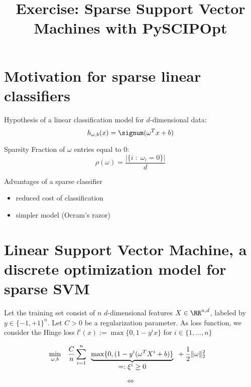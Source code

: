 \documentclass[10pt]{beamer}
\title{Exercise: Sparse Support Vector Machines with PySCIPOpt}
\begin{document}
\section{Motivation for sparse linear classifiers}

Hypothesis of a linear classification model for $d$-dimensional data:
\begin{displaymath}
  h_{\omega, b}(x) = \signum (\omega^{T}x + b)
\end{displaymath}

\begin{block}{Sparsity}
  Fraction of $\omega$ entries equal to 0:
  \begin{displaymath}
    \rho(\omega) = \frac{|\{ i \; : \; \omega_{i} = 0 \}|}{d}
  \end{displaymath}
\end{block}

Advantages of a sparse classifier
\begin{itemize}
  \item reduced cost of classification
  \item simpler model (Ocram's razor)
\end{itemize}

\section{Linear Support Vector Machine, a discrete optimization model for sparse SVM}

Let the training set consist of $n$ $d$-dimensional features $X \in \RR^{n,d}$, labeled by $y \in \{-1,+1\}^{n}$. Let $C > 0$ be a regularization parameter.
As loss function, we consider the Hinge loss $l^{i}(x) :=  \max \{0, 1 - y^{i}x\}$ for $i \in \{1,\dots, n\}$

\begin{equation*}
  \begin{aligned}
    & \min\limits_{\omega, b}
    & & \frac{C}{n} \sum\limits_{i = 1}^{n}
    \begin{array}[t]{c}
      \underbrace{\max\{0, (1 - y^{i} (\omega^{T}X^{i} + b)\}}\\
            =: \xi^{i} \geq 0
    \end{array}
    +\frac{1}{2} \lVert \omega \rVert_{2}^{2}
  \end{aligned}
\end{equation*}


\begin{displaymath}
  \Leftrightarrow
\end{displaymath}
\end{document}

